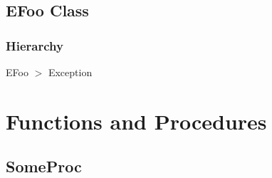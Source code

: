 \documentclass{report}
\newif\ifpdf
\begin{document}
\subsection*{EFoo Class}
\fi
\label{ok_tag_params_no_parens.EFoo}
\subsubsection*{\large{\textbf{Hierarchy}}\normalsize\hspace{1ex}\hfill}
EFoo {$>$} Exception
\section{Functions and Procedures}
\ifpdf
\subsection*{\large{\textbf{SomeProc}}\normalsize\hspace{1ex}\hrulefill}
\else
\end{document}
